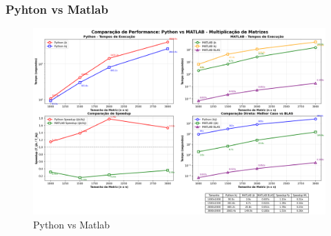 \documentclass[utf8]{beamer}
\theoremstyle{definition}
\begin{document}
\begin{frame}
		\frametitle{Pyhton vs Matlab}
	\begin{figure}[H]
		\centering
		\includegraphics[width=0.80\linewidth]{Figuras/comparacao_python_matlab}
		\caption{Python vs Matlab}
		\label{fig:performace_python_vs_matlab}
	\end{figure}
\end{frame}
\end{document}
